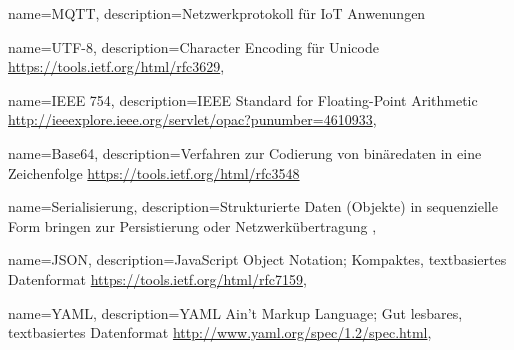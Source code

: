 




{
    name=MQTT,
    description={Netzwerkprotokoll für IoT Anwenungen}
}


{
    name=UTF-8,
    description={Character Encoding für Unicode \url{https://tools.ietf.org/html/rfc3629}}, 
}

{
    name=IEEE 754,
    description={IEEE Standard for Floating-Point Arithmetic   \url{http://ieeexplore.ieee.org/servlet/opac?punumber=4610933}}, 
}


{
    name=Base64,
    description={Verfahren zur Codierung von binäredaten in eine Zeichenfolge
     \url{https://tools.ietf.org/html/rfc3548}}
}

{
    name=Serialisierung,
    description={Strukturierte Daten (Objekte) in sequenzielle Form bringen zur Persistierung oder Netzwerkübertragung }, 
}

{
    name=JSON,
    description={JavaScript Object Notation; Kompaktes, textbasiertes Datenformat
    \url{https://tools.ietf.org/html/rfc7159}}, 
}

{
    name=YAML,
    description={YAML Ain't Markup Language; Gut lesbares, textbasiertes Datenformat
    \url{http://www.yaml.org/spec/1.2/spec.html}},
}
